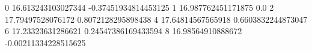 0 16.613243103027344 -0.37451934814453125
1 16.987762451171875 0.0
2 17.79497528076172 0.8072128295898438
4 17.64814567565918 0.6603832244873047
6 17.23323631286621 0.24547386169433594
8 16.98564910888672 -0.00211334228515625
